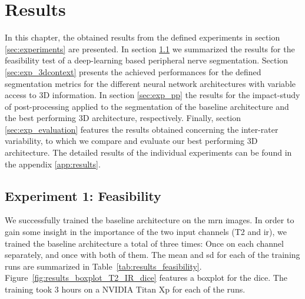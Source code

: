 \chapter{Results} \label{chap:results}
In this chapter, the obtained results from the defined experiments in section \ref{sec:experiments} are presented. In section \ref{sec:exp_feas} we summarized the results for the feasibility test of a deep-learning based peripheral nerve segmentation.
Section \ref{sec:exp_3dcontext} presents the achieved performances for the defined segmentation metrics for the different neural network architectures with variable access to 3D information.
In section \ref{sec:exp_pp} the results for the impact-study of post-processing applied to the segmentation of the baseline architecture and the best performing 3D architecture, respectively.
Finally, section \ref{sec:exp_evaluation} features the results obtained concerning the inter-rater variability, to which we compare and evaluate our best performing 3D architecture.
The detailed results of the individual experiments can be found in the appendix \ref{app:results}.

\section{Experiment 1: Feasibility} \label{sec:exp_feas} %
We successfully trained the baseline architecture on the \gls{mrn} images. In order to gain some insight in the importance of the two input channels (T2 and \gls{ir}), we trained the baseline architecture a total of three times: Once on each channel separately, and once with both of them. The mean and \gls{sd} for each of the training runs are summarized in Table~\ref{tab:results_feasibility}. Figure~\ref{fig:results_boxplot_T2_IR_dice} features a boxplot for the \acrlong{dice}. The training took 3 hours on a NVIDIA Titan Xp for each of the runs.

